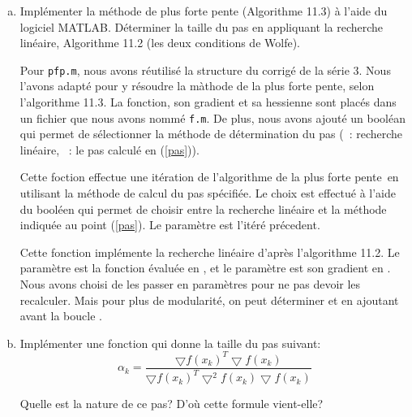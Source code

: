 \documentclass[11pt,a4paper,twoside,onecolumn,titlepage]{report}
\newcommand{\pfp}{plus forte pente}
\begin{document}
\begin{enumerate}[(a)]
\item\label{pfp} Implémenter la méthode de plus forte pente (Algorithme 11.3) à l'aide du logiciel MATLAB. Déterminer la taille du pas en appliquant la recherche linéaire, Algorithme 11.2 (les deux conditions de Wolfe).

%
%

Pour \texttt{pfp.m}, nous avons réutilisé la structure du corrigé de la série 3. Nous l'avons adapté pour y résoudre la màthode de la plus forte pente, selon l'algorithme 11.3. La fonction, son gradient et sa hessienne sont placés dans un fichier que nous avons nommé \texttt{f.m}. De plus, nous avons ajouté un booléan  qui permet de sélectionner la méthode de détermination du pas (~: recherche linéaire, ~: le pas calculé en (\ref{pas})).



Cette foction effectue une itération de l'algorithme de la \pfp\ en utilisant la méthode de calcul du pas spécifiée. Le choix est effectué à l'aide du booléen  qui permet de choisir entre la recherche linéaire et la méthode indiquée au point (\ref{pas}). Le paramètre  est l'itéré précedent.

%
%

Cette fonction implémente la recherche linéaire d'après l'algorithme 11.2. Le paramètre  est la fonction évaluée en , et le paramètre  est son gradient en . Nous avons choisi de les passer en paramètres pour ne pas devoir les recalculer. Mais pour plus de modularité, on peut déterminer  et  en ajoutant  avant la boucle .

%
%
%

\item\label{pas} Implémenter une fonction qui donne la taille du pas suivant:
\begin{equation}\label{eq:cauchy}
\alpha_k = \frac{\bigtriangledown f(x_k)^T \bigtriangledown f(x_k)}{\bigtriangledown f(x_k)^T \bigtriangledown^2 f(x_k) \bigtriangledown f(x_k)}
\end{equation}

Quelle est la nature de ce pas? D'où cette formule vient-elle?


\end{enumerate}
\end{document}
